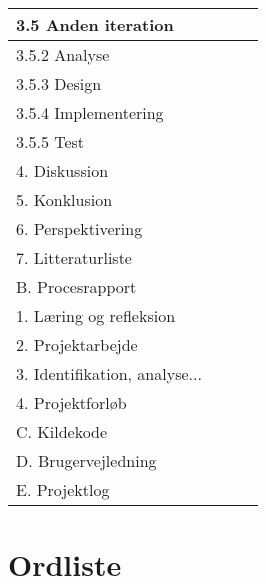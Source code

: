 \begin{center}
\begin{longtable}{|m{5.8cm}|m{3.5cm}|m{3.5cm}|m{3.2cm}|}
3.5 Anden iteration & & & \\ \hline
3.5.2 Analyse & & & \\ \hline
3.5.3 Design & & & \\ \hline
3.5.4 Implementering & & & \\ \hline
3.5.5 Test & & & \\ \hline

4. Diskussion & & & \\ \hline

5. Konklusion & & & \\ \hline

6. Perspektivering & & & \\ \hline

7. Litteraturliste & & & \\ \hline

B. Procesrapport & & & \\ \hline
1. Læring og refleksion & & & \\ \hline
2. Projektarbejde & & & \\ \hline
3. Identifikation, analyse... & & & \\ \hline
4. Projektforløb & & & \\ \hline

C. Kildekode & & & \\ \hline

D. Brugervejledning & & & \\ \hline

E. Projektlog & & & \\ \hline


\end{longtable}
\end{center}

\section{Ordliste}

